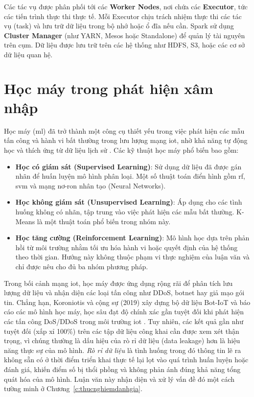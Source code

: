 Các tác vụ được phân phối tới các \textbf{Worker Nodes}, nơi chứa các \textbf{Executor}, tức các tiến trình thực thi thực tế. Mỗi Executor chịu trách nhiệm thực thi các tác vụ (task) và lưu trữ dữ liệu trong bộ nhớ hoặc ổ đĩa nếu cần. Spark sử dụng \textbf{Cluster Manager} (như YARN, Mesos hoặc Standalone) để quản lý tài nguyên trên cụm. Dữ liệu được lưu trữ trên các hệ thống như HDFS, S3, hoặc các cơ sở dữ liệu quan hệ.

\section{Học máy trong phát hiện xâm nhập}

Học máy (\ac{ml}) đã trở thành một công cụ thiết yếu trong việc phát hiện các mẫu tấn công và hành vi bất thường trong lưu lượng mạng \ac{iot}, nhờ khả năng tự động học và thích ứng từ dữ liệu lịch sử \cite{Buczak2016}. Các kỹ thuật học máy phổ biến bao gồm:

\begin{itemize}
\item \textbf{Học có giám sát (Supervised Learning)}: Sử dụng dữ liệu đã được gán nhãn để huấn luyện mô hình phân loại. Một số thuật toán điển hình gồm \ac{rf}, \ac{svm} và mạng nơ-ron nhân tạo (Neural Networks).
\item \textbf{Học không giám sát (Unsupervised Learning)}: Áp dụng cho các tình huống không có nhãn, tập trung vào việc phát hiện các mẫu bất thường. K-Means là một thuật toán phổ biến trong nhóm này.
\item \textbf{Học tăng cường (Reinforcement Learning)}: Mô hình học dựa trên phản hồi từ môi trường nhằm tối ưu hóa hành vi hoặc quyết định của hệ thống theo thời gian. Hướng này không thuộc phạm vi thực nghiệm của luận văn và chỉ được nêu cho đủ ba nhóm phương pháp.
\end{itemize}

Trong bối cảnh mạng \ac{iot}, học máy được ứng dụng rộng rãi để phân tích lưu lượng dữ liệu và nhận diện các loại tấn công như DDoS, botnet hay giả mạo gói tin. Chẳng hạn, Koroniotis và cộng sự (2019) xây dựng bộ dữ liệu Bot-IoT và báo cáo các mô hình học máy, học sâu đạt độ chính xác gần tuyệt đối khi phát hiện các tấn công DoS/DDoS trong môi trường \ac{iot} \cite{Koroniotis2019}. Tuy nhiên, các kết quả gần như tuyệt đối (xấp xỉ 100\%) trên các tập dữ liệu công khai cần được xem xét thận trọng, vì chúng thường là dấu hiệu của rò rỉ dữ liệu (data leakage) hơn là hiệu năng thực sự của mô hình. \emph{Rò rỉ dữ liệu} là tình huống trong đó thông tin lẽ ra không sẵn có ở thời điểm triển khai thực tế lại lọt vào quá trình huấn luyện hoặc đánh giá, khiến điểm số bị thổi phồng và không phản ánh đúng khả năng tổng quát hóa của mô hình. Luận văn này nhận diện và xử lý vấn đề đó một cách tường minh ở Chương~\ref{c:thucnghiemdanhgia}.

